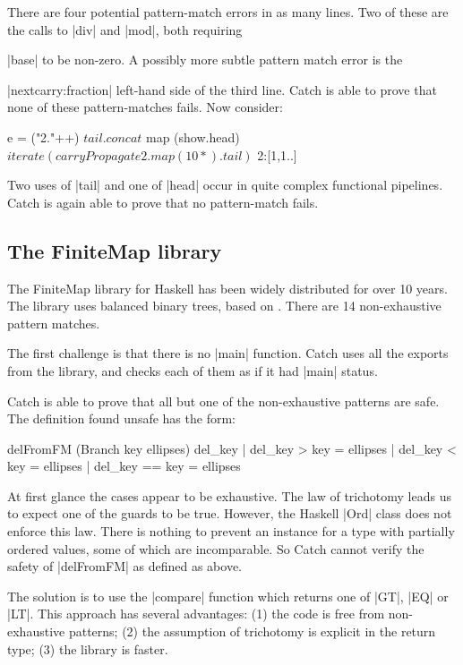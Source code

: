\noindent There are four potential pattern-match errors in as many lines. Two of these are the calls to |div| and |mod|, both requiring \ignore|base| to be non-zero. A possibly more subtle pattern match error is the \ignore|nextcarry:fraction| left-hand side of the third line. Catch is able to prove that none of these pattern-matches fails. Now consider:

\begin{code}
e =  ("2."++) $
     tail . concat $
     map (show.head) $
     iterate (carryPropagate 2 . map (10*) . tail) $
     2:[1,1..]
\end{code}

\noindent Two uses of |tail| and one of |head| occur in quite complex functional pipelines. Catch is again able to prove that no pattern-match fails.

\subsection{The FiniteMap library}
\label{secC:finitemap}

The FiniteMap library for Haskell has been widely distributed for over 10 years. The library uses balanced binary trees, based on \cite{adams:sets}. There are 14 non-exhaustive pattern matches.

The first challenge is that there is no |main| function. Catch uses all the exports from the library, and checks each of them as if it had |main| status.

Catch is able to prove that all but one of the non-exhaustive patterns are safe. The definition found unsafe has the form:

\begin{code}
delFromFM (Branch key ellipses) del_key  | del_key  >   key = ellipses
                                         | del_key  <   key = ellipses
                                         | del_key  ==  key = ellipses
\end{code}

At first glance the cases appear to be exhaustive. The law of trichotomy leads us to expect one of the guards to be true. However, the Haskell |Ord| class does not enforce this law. There is nothing to prevent an instance for a type with partially ordered values, some of which are incomparable. So Catch cannot verify the safety of |delFromFM| as defined as above.

The solution is to use the |compare| function which returns one of |GT|, |EQ| or |LT|. This approach has several advantages: (1) the code is free from non-exhaustive patterns; (2) the assumption of trichotomy is explicit in the return type; (3) the library is faster.


